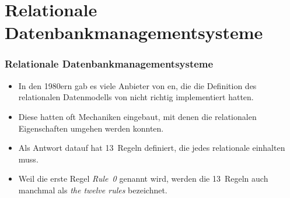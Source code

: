 \documentclass[aspectratio=169,mathserif,notheorems]{beamer}%
\begin{document}
\section{Relationale Datenbankmanagementsysteme}%
%
\begin{frame}%
\frametitle{Relationale Datenbankmanagementsysteme}%
\begin{itemize}%
\item In den 1980ern gab es viele Anbieter von en, die die Definition des relationalen Datenmodells von \citeauthor{C1985IYDRR} nicht richtig implementiert hatten.%
%
\item<2-> Diese hatten oft Mechaniken eingebaut, mit denen die relationalen Eigenschaften umgehen werden konnten.%
%
\item<3-> Als Antwort datauf hat \citeauthor{C1985IYDRR} 13~Regeln definiert, die jedes relationale  einhalten muss\cite{C1985IYDRR,C1986AESFDBMSTACTBR,S2024D:LDMRMRA,SP2002STYSI2D,SPMP1998SI2TDDASVEI12T}.%
%
\item<4-> Weil die erste Regel \emph{Rule~0} genannt wird, werden die 13~Regeln auch manchmal als \emph{the twelve rules} bezeichnet.%
\end{itemize}%
\end{frame}%
%
\end{document}
